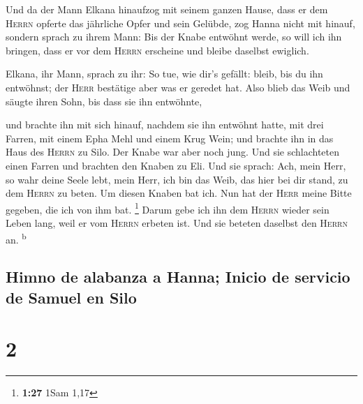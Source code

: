  Und da der Mann Elkana hinaufzog mit seinem ganzen
Hause, dass er dem \textsc{Herrn} opferte das jährliche Opfer und sein
Gelübde,  zog Hanna nicht mit hinauf, sondern sprach zu
ihrem Mann: Bis der Knabe entwöhnt werde, so will ich ihn bringen, dass
er vor dem \textsc{Herrn} erscheine und bleibe daselbst ewiglich.

 Elkana, ihr Mann, sprach zu ihr: So tue, wie dir's
gefällt: bleib, bis du ihn entwöhnst; der \textsc{Herr} bestätige aber
was er geredet hat. Also blieb das Weib und säugte ihren Sohn, bis dass
sie ihn entwöhnte,

 und brachte ihn mit sich hinauf, nachdem sie ihn
entwöhnt hatte, mit drei Farren, mit einem Epha Mehl und einem Krug
Wein; und brachte ihn in das Haus des \textsc{Herrn} zu Silo. Der Knabe
war aber noch jung.  Und sie schlachteten einen Farren
und brachten den Knaben zu Eli.  Und sie sprach: Ach,
mein Herr, so wahr deine Seele lebt, mein Herr, ich bin das Weib, das
hier bei dir stand, zu dem \textsc{Herrn} zu beten.  Um
diesen Knaben bat ich. Nun hat der \textsc{Herr} meine Bitte gegeben,
die ich von ihm bat. \footnote{\textbf{1:27} 1Sam 1,17} 
Darum gebe ich ihn dem \textsc{Herrn} wieder sein Leben lang, weil er
vom \textsc{Herrn} erbeten ist. Und sie beteten daselbst den
\textsc{Herrn} an. \textsuperscript{b}

\hypertarget{himno-de-alabanza-a-hanna-inicio-de-servicio-de-samuel-en-silo}{%
\subsection{Himno de alabanza a Hanna; Inicio de servicio de Samuel en
Silo}\label{himno-de-alabanza-a-hanna-inicio-de-servicio-de-samuel-en-silo}}

\hypertarget{section-1}{%
\section{2}\label{section-1}}

